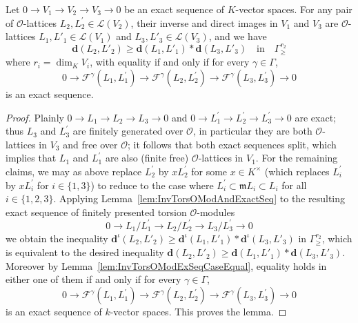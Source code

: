 \begin{lemm}\label{lem:RelPos=000026ExcSeq}
Let $0\rightarrow V_{1}\rightarrow V_{2}\rightarrow V_{3}\rightarrow0$ be an exact sequence of $K$-vector spaces. For any pair of $\mathcal{O}$-lattices $L_{2},L_{2}^{\prime}\in\mathcal{L}(V_{2})$, their inverse and direct images in $V_{1}$ and $V_{3}$ are $\mathcal{O}$-lattices $L_{1},L'_{1}\in\mathcal{L}(V_{1})$ and $L_{3},L'_{3}\in\mathcal{L}(V_{3})$, and we have
\[
\mathbf{d}(L_{2},L'_{2})\geq\mathbf{d}(L_{1},L'_{1})\ast\mathbf{d}(L_{3},L'_{3})\quad\text{in}\quad\Gamma_{\geq}^{r_{2}}
\]
where $r_{i}=\dim_{K}V_{i}$, with equality if and only if for every $\gamma\in\Gamma$,
\[
0\rightarrow\mathcal{F}^{\gamma}(L_{1},L_{1}^{\prime})\rightarrow\mathcal{F}^{\gamma}(L_{2},L_{2}^{\prime})\rightarrow\mathcal{F}^{\gamma}(L_{3},L_{3}^{\prime})\rightarrow0
\]
is an exact sequence.
\end{lemm}
\begin{proof}
Plainly $0\rightarrow L_{1}\rightarrow L_{2}\rightarrow L_{3}\rightarrow0$ and $0\rightarrow L_{1}^{\prime}\rightarrow L_{2}^{\prime}\rightarrow L_{3}^{\prime}\rightarrow0$ are exact; thus $L_{3}$ and $L_{3}^{\prime}$ are finitely generated over $\mathcal{O}$, in particular they are both $\mathcal{O}$-lattices in $V_{3}$ and free over $\mathcal{O}$; it follows that both exact sequences split, which implies that $L_{1}$ and $L_{1}^{\prime}$ are also (finite free) $\mathcal{O}$-lattices in $V_{1}$. For the remaining claims, we may as above replace $L_{2}^{\prime}$ by $xL_{2}^{\prime}$ for some $x\in K^{\times}$ (which replaces $L_{i}^{\prime}$ by $xL_{i}^{\prime}$ for $i\in\{1,3\}$) to reduce to the case where $L_{i}^{\prime}\subset\mathfrak{m}L_{i}\subset L_{i}$ for all $i\in\{1,2,3\}$. Applying Lemma~\ref{lem:InvTorsOModAndExactSeq} to the resulting exact sequence of finitely presented torsion $\mathcal{O}$-modules
\[
0\rightarrow L_{1}/L_{1}^{\prime}\rightarrow L_{2}/L_{2}^{\prime}\rightarrow L_{3}/L_{3}^{\prime}\rightarrow0
\]
we obtain the inequality $\mathbf{d}^{\iota}(L_{2},L'_{2})\geq\mathbf{d}^{\iota}(L_{1},L'_{1})\ast\mathbf{d}^{\iota}(L_{3},L'_{3})$ in $\Gamma_{\geq}^{r_{2}}$, which is equivalent to the desired inequality $\mathbf{d}(L_{2},L'_{2})\geq\mathbf{d}(L_{1},L'_{1})\ast\mathbf{d}(L_{3},L'_{3})$. Moreover by Lemma~\ref{lem:InvTorsOModExSeqCaseEqual}, equality holds in either one of them if and only if for every $\gamma\in\Gamma$,
\[
0\rightarrow\mathcal{F}^{\gamma}(L_{1},L_{1}^{\prime})\rightarrow\mathcal{F}^{\gamma}(L_{2},L_{2}^{\prime})\rightarrow\mathcal{F}^{\gamma}(L_{3},L_{3}^{\prime})\rightarrow0
\]
is an exact sequence of $k$-vector spaces. This proves the lemma.
\end{proof}

